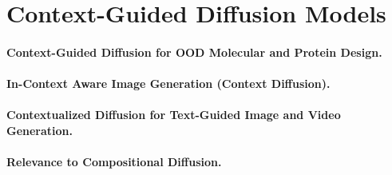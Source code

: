 \section{Context-Guided Diffusion Models}
\label{sec:context_guided_diffusion}

\paragraph{Context-Guided Diffusion for OOD Molecular and Protein Design.}

\paragraph{In-Context Aware Image Generation (Context Diffusion).}

\paragraph{Contextualized Diffusion for Text-Guided Image and Video Generation.}

\paragraph{Relevance to Compositional Diffusion.}
